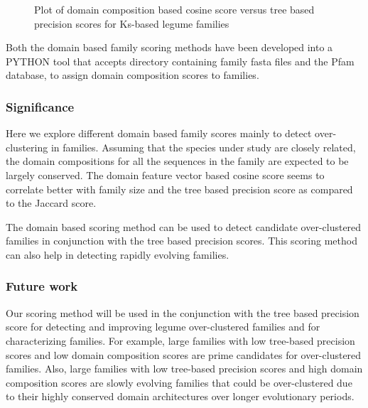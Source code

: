 \documentclass{article}
\begin{document}
		\begin{figure}
			\caption{Plot of domain composition based cosine score versus tree based precision scores for Ks-based legume families}
			\label{fig:scatter_domain_cosine_vs_tree_precision_lgf5}
		\end{figure}
		
		Both the domain based family scoring methods have been developed into a PYTHON tool that accepts directory containing family fasta files and the Pfam database, to assign domain composition scores to families.
	
	\subsubsection{Significance}
	Here we explore different domain based family scores mainly to detect over-clustering in families. Assuming that the species under study are closely related, the domain compositions for all the sequences in the family are expected to be largely conserved. The domain feature vector based cosine score seems to correlate better with family size and the tree based precision score as compared to the Jaccard score.
	
	The domain based scoring method can be used to detect candidate over-clustered families in conjunction with the tree based precision scores. This scoring method can also help in detecting rapidly evolving families.
	
	\subsubsection{Future work}
	Our scoring method will be used in the conjunction with the tree based precision score for detecting and improving  legume over-clustered families and for characterizing families. For example,  large families with low tree-based precision scores and low domain composition scores are prime candidates for over-clustered families. Also, large families with low tree-based precision scores and high domain composition scores are slowly evolving families that could be over-clustered due to their highly conserved domain architectures over longer evolutionary periods.
	
\end{document}
